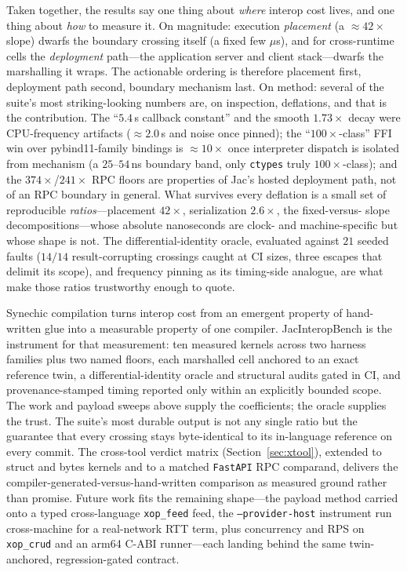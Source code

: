 \documentclass[conference]{IEEEtran}
\newcommand{\code}[1]{\texttt{#1}}
\begin{document}
Taken together, the results say one thing about \emph{where} interop cost lives,
and one thing about \emph{how} to measure it. On magnitude: execution
\emph{placement} (a $\approx$$42\times$ slope) dwarfs the boundary crossing itself
(a fixed few $\mu$s), and for cross-runtime cells the \emph{deployment} path---the
application server and client stack---dwarfs the marshalling it wraps. The
actionable ordering is therefore placement first, deployment path second, boundary
mechanism last. On method: several of the suite's most striking-looking numbers
are, on inspection, deflations, and that is the contribution. The
``$5.4$\,\textmu s callback constant'' and the smooth $1.73\times$ decay were
CPU-frequency artifacts ($\approx$$2.0$\,\textmu s and noise once pinned); the
``$100\times$-class'' FFI win over pybind11-family bindings is $\approx$$10\times$
once interpreter dispatch is isolated from mechanism (a $25$--$54$\,ns boundary
band, only \code{ctypes} truly $100\times$-class); and the $374\times$/$241\times$
RPC floors are properties of Jac's hosted deployment path, not of an RPC boundary
in general. What survives every deflation is a small set of reproducible
\emph{ratios}---placement $42\times$, serialization $2.6\times$, the fixed-versus-%
slope decompositions---whose absolute nanoseconds are clock- and machine-specific
but whose shape is not. The differential-identity oracle, evaluated against $21$
seeded faults ($14/14$ result-corrupting crossings caught at CI sizes, three
escapes that delimit its scope), and frequency pinning as its timing-side
analogue, are what make those ratios trustworthy enough to quote.

Synechic compilation turns interop cost from an emergent property of hand-written
glue into a measurable property of one compiler. JacInteropBench is the
instrument for that measurement: ten measured kernels across two harness
families plus two named floors, each marshalled cell anchored to an exact
reference twin, a differential-identity oracle and structural audits gated in CI,
and provenance-stamped timing reported only within an explicitly bounded scope.
The work and payload sweeps above supply the coefficients; the oracle supplies
the trust. The suite's most durable output is not any single ratio but the
guarantee that every crossing stays byte-identical to its in-language reference on
every commit. The cross-tool verdict matrix (Section~\ref{sec:xtool}), extended
to struct and bytes kernels and to a matched \code{FastAPI} RPC comparand,
delivers the compiler-generated-versus-hand-written comparison as measured
ground rather than promise. Future work fits the
remaining shape---the payload method carried onto a typed cross-language
\code{xop\_feed} feed, the \code{--provider-host} instrument run cross-machine
for a real-network RTT term, plus concurrency and RPS on
\code{xop\_crud} and an arm64 C-ABI runner---each landing behind the same
twin-anchored, regression-gated contract.
\end{document}
